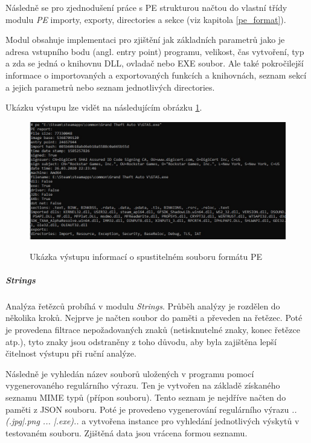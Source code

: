 Následně se pro zjednodušení práce s PE strukturou načtou do vlastní třídy modulu \emph{PE} importy, exporty, directories a sekce (viz kapitola \ref{pe_format}).

Modul obsahuje implementaci pro zjištění jak základních parametrů jako je adresa vstupního bodu (angl. entry point) programu, velikost, čas vytvoření, typ a zda se jedná o knihovnu DLL, ovladač nebo EXE soubor. Ale také pokročilejší informace o importovaných a exportovaných funkcích a knihovnách, seznam sekcí a jejich parametrů nebo seznam jednotlivých directories. 

Ukázku výstupu lze vidět na následujícím obrázku \ref{fig:consolePeResult}.

\begin{figure}[H]
    \caption{Ukázka výstupu informací o spustitelném souboru formátu PE}
    \centering
    \includegraphics[width=160mm,scale=0.5]{Figures/obrazky/konzole-pe.jpg}
    \label{fig:consolePeResult}
\end{figure}


\subparagraph*{Strings}

Analýza řetězců probíhá v modulu \emph{Strings}. Průběh analýzy je rozdělen do několika kroků.
Nejprve je načten soubor do paměti a převeden na řetězec.
Poté je provedena filtrace nepožadovaných znaků (netisknutelné znaky, konec řetězce atp.), tyto znaky jsou odstraněny z toho důvodu, aby byla zajištěna lepší čitelnost výstupu při ruční analýze.

Následně je vyhledán název souborů uložených v programu pomocí vygenerovaného regulárního výrazu. Ten je vytvořen na základě získaného seznamu MIME typů (přípon souboru). Tento seznam je nejdříve načten do paměti z JSON souboru. Poté je provedeno vygenerování regulárního výrazu \emph{..(.jpg|.png ... |.exe)..} a vytvořena instance pro vyhledání jednotlivých výskytů v testovaném souboru. Zjištěná data jsou vrácena formou seznamu.

